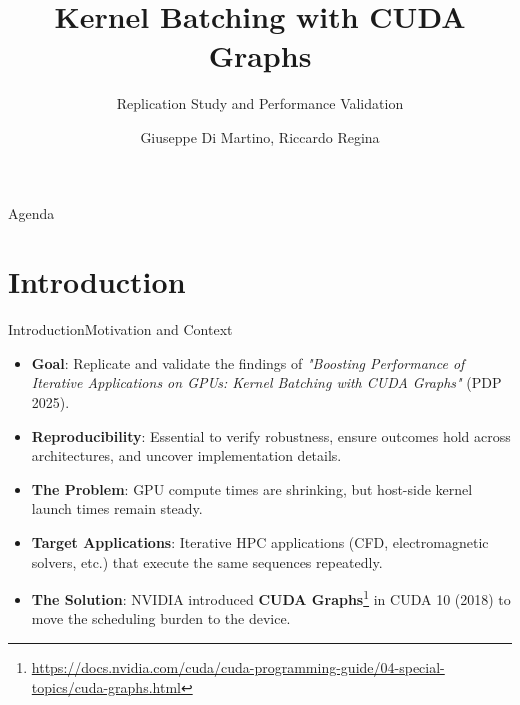 \documentclass[10pt,aspectratio=43]{beamer}
\title[Kernel Batching with CUDA Graphs]{Kernel Batching with CUDA Graphs}
\subtitle{Replication Study and Performance Validation}
\author[Giuseppe Di Martino, Riccardo Regina]{Giuseppe Di Martino, Riccardo Regina}
\institute[
    Università degli Studi di Napoli Federico II
]
{
    Università degli Studi di Napoli Federico II
}
\begin{document}
\maketitle

\begin{frame}{Agenda}{}
    \tableofcontents
\end{frame}

\section{Introduction}
\begin{frame}{Introduction}{Motivation and Context}
    \begin{itemize}
        \item \textbf{Goal}: Replicate and validate the findings of \textit{"Boosting Performance of Iterative Applications on GPUs: Kernel Batching with CUDA Graphs"} \cite{10974864} (PDP 2025).
        \item \textbf{Reproducibility}: Essential to verify robustness, ensure outcomes hold across architectures, and uncover implementation details.
        \item \textbf{The Problem}: GPU compute times are shrinking, but host-side kernel launch times remain steady.
        \item \textbf{Target Applications}: Iterative HPC applications (CFD, electromagnetic solvers, etc.) that execute the same sequences repeatedly.
        \item \textbf{The Solution}: NVIDIA introduced \textbf{CUDA Graphs}\footnote[frame]{\url{https://docs.nvidia.com/cuda/cuda-programming-guide/04-special-topics/cuda-graphs.html}} in CUDA 10 (2018) to move the scheduling burden to the device.
    \end{itemize}
\end{frame}

\end{document}

